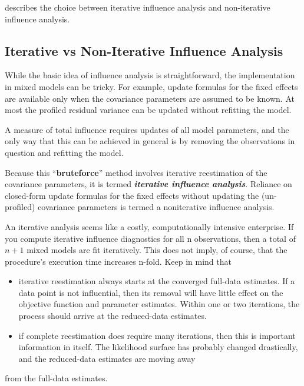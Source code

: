 \documentclass[Main.tex]{subfiles}
\begin{document}
	\citet{schabenberger} describes the choice between  iterative influence analysis and  non-iterative influence analysis.
	
	
	
	\subsection{Iterative vs Non-Iterative Influence Analysis}
	While the basic idea of influence analysis is straightforward, the implementation in mixed models can be
	tricky. For example, update formulas for the fixed effects are available only when the covariance parameters
	are assumed to be known. At most the profiled residual variance can be updated without refitting the model.
	
	A measure of total influence requires updates of all model parameters, and the only way that this can be
	achieved in general is by removing the observations in question and refitting the model. 
	
	Because this “\textbf{bruteforce}”
	method involves iterative reestimation of the covariance parameters, it is termed \textbf{\textit{iterative influence
	analysis}}. Reliance on closed-form update formulas for the fixed effects without updating the (un-profiled)
	covariance parameters is termed a noniterative influence analysis.
	
	An iterative analysis seems like a costly, computationally intensive enterprise. If you compute iterative
	influence diagnostics for all n observations, then a total of $n + 1$ mixed models are fit iteratively. This does
	not imply, of course, that the procedure’s execution time increases n-fold. Keep in mind that
	\begin{itemize}
		\item iterative reestimation always starts at the converged full-data estimates. If a data point is not influential,
		then its removal will have little effect on the objective function and parameter estimates. Within
		one or two iterations, the process should arrive at the reduced-data estimates.
		\item if complete reestimation does require many iterations, then this is important information in itself. The
		likelihood surface has probably changed drastically, and the reduced-data estimates are moving away
	\end{itemize}
	from the full-data estimates.
	
	
\end{document}
